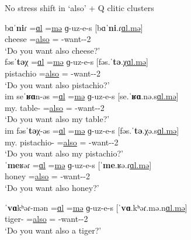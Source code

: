 \begin{exe}
	\ex No stress shift in `also' + Q   clitic clusters\label{example:stress:cliticCluster:AlsoQ}
	\begin{xlist}
		\ex \gll bɑˈ\textbf{ni}ɾ =\underline{ɑl} =\underline{mə}  ɡ-uz-e-s [bɑˈ\textbf{ni}.ɾ\underline{ɑl.mə}]
		\\
		cheese =\underline{also} =\underline{{\q}} {\ind}-want-{\thgloss}-2{\sg}
		\\
		\trans `Do you  want also cheese?'
		\\
		\ex \gll  fəsˈ\textbf{tə}χ =\underline{ɑl} =\underline{mə} ɡ-uz-e-s  [fəs.ˈ\textbf{tə}.χ\underline{ɑl.mə}]
		\\
		pistachio  =\underline{also}  =\underline{{\q}} {\ind}-want-{\thgloss}-2{\sg}
		\\
		\trans `Do you  want also pistachio?'
		\\
		\ex \gll   im seˈ\textbf{ʁɑ}n-əs =\underline{ɑl} =\underline{mə} ɡ-uz-e-s  [se.ˈ\textbf{ʁɑ}.nə.s\underline{ɑl.mə}]
		\\
		my.{\gen} table-{\possFsg} =\underline{also}  =\underline{{\q}} {\ind}-want-{\thgloss}-2{\sg}
		\\
		\trans `Do you  want also my table?'
		\\
		\ex \gll   im fəsˈ\textbf{tə}χ-əs =\underline{ɑl} =\underline{mə} ɡ-uz-e-s  [fəs.ˈ\textbf{tə}.χə.s\underline{ɑl.mə}]
		\\
		my.{\gen} pistachio-{\possFsg}  =\underline{also} =\underline{{\q}} {\ind}-want-{\thgloss}-2{\sg}
		\\
		\trans `Do you  want also my pistachio?'
		\\
		\ex \gll   ˈ\textbf{me}ʁəɾ =\underline{ɑl}  =\underline{mə} ɡ-uz-e-s  [ˈ\textbf{me}.ʁə.ɾ\underline{ɑl.mə}]
		\\
		honey  =\underline{also}  =\underline{{\q}} {\ind}-want-{\thgloss}-2{\sg}
		\\
		\trans `Do you  want also   honey?'
		\\
		
		\ex \gll   ˈ\textbf{vɑ}kʰəɾ-mən =\underline{ɑl} =\underline{mə} ɡ-uz-e-s   [ˈ\textbf{vɑ}.kʰəɾ.mə.n\underline{ɑl.mə}]
		\\
		tiger-{\indf}  =\underline{also} =\underline{{\q}} {\ind}-want-{\thgloss}-2{\sg}
		\\
		\trans `Do you  want also   a tiger?'
		\\
	\end{xlist}
\end{exe}



